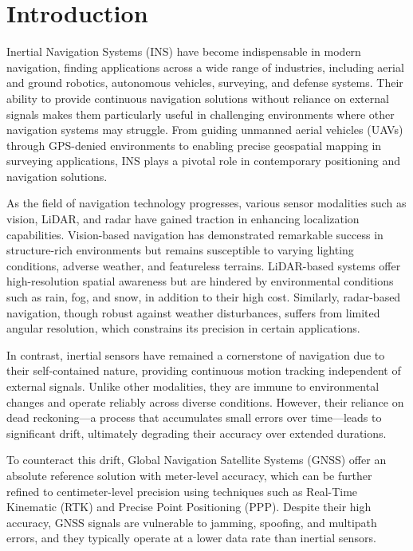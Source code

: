\documentclass[conference]{IEEEtran}
\begin{document}
\section{Introduction}
Inertial Navigation Systems (INS) have become indispensable in modern navigation, finding applications across a wide range of industries, including aerial and ground robotics, autonomous vehicles, surveying, and defense systems. Their ability to provide continuous navigation solutions without reliance on external signals makes them particularly useful in challenging environments where other navigation systems may struggle. From guiding unmanned aerial vehicles (UAVs) through GPS-denied environments to enabling precise geospatial mapping in surveying applications, INS plays a pivotal role in contemporary positioning and navigation solutions.

As the field of navigation technology progresses, various sensor modalities such as vision, LiDAR, and radar have gained traction in enhancing localization capabilities. Vision-based navigation has demonstrated remarkable success in structure-rich environments but remains susceptible to varying lighting conditions, adverse weather, and featureless terrains. LiDAR-based systems offer high-resolution spatial awareness but are hindered by environmental conditions such as rain, fog, and snow, in addition to their high cost. Similarly, radar-based navigation, though robust against weather disturbances, suffers from limited angular resolution, which constrains its precision in certain applications.

In contrast, inertial sensors have remained a cornerstone of navigation due to their self-contained nature, providing continuous motion tracking independent of external signals. Unlike other modalities, they are immune to environmental changes and operate reliably across diverse conditions. However, their reliance on dead reckoning—a process that accumulates small errors over time—leads to significant drift, ultimately degrading their accuracy over extended durations.

To counteract this drift, Global Navigation Satellite Systems (GNSS) offer an absolute reference solution with meter-level accuracy, which can be further refined to centimeter-level precision using techniques such as Real-Time Kinematic (RTK) and Precise Point Positioning (PPP). Despite their high accuracy, GNSS signals are vulnerable to jamming, spoofing, and multipath errors, and they typically operate at a lower data rate than inertial sensors.
\end{document}
